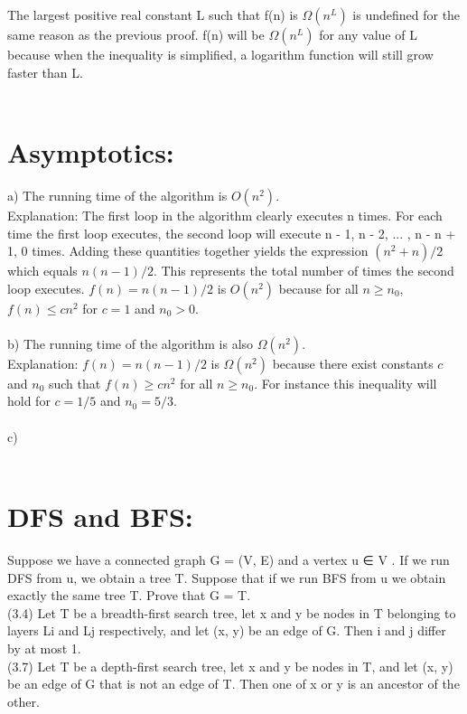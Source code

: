\documentclass{article}
\begin{document}
The largest positive real constant L such that f(n) is $\Omega(n^L)$ is undefined for the same reason as the previous proof. f(n) will be $\Omega(n^L)$ for any value of L because when the inequality is simplified, a logarithm function will still grow faster than L.\\\\

\section{Asymptotics:}
a) The running time of the algorithm is $O(n^2)$.\\
Explanation: The first loop in the algorithm clearly executes n times. For each time the first loop executes, the second loop will execute n - 1, n - 2, ... , n - n + 1, 0 times. Adding these quantities together yields the expression $(n^2 + n)/2$ which equals $n(n-1)/2$. This represents the total number of times the second loop executes. $f(n) = n(n-1)/2$ is $O(n^2)$ because for all $n \geq n_0$, $f(n) \leq cn^2$ for $c = 1$ and $n_0 > 0$.\\\\
b) The running time of the algorithm is also $\Omega(n^2)$.\\
Explanation: $f(n) = n(n-1)/2$ is $\Omega(n^2)$ because there exist constants $c$ and $n_0$ such that $f(n) \geq cn^2$ for all $n \geq n_0$. For instance this inequality will hold for $c = 1/5$ and $n_0 = 5/3$.\\\\
c)\\\\

\section{DFS and BFS:}
Suppose we have a connected graph G = (V, E)
and a vertex u ∈ V . If we run DFS from u, we obtain a tree T. Suppose that if we run BFS from u we
obtain exactly the same tree T. Prove that G = T.\\

(3.4) Let T be a breadth-first search tree, let x and y be nodes in T belonging
to layers Li and Lj respectively, and let (x, y) be an edge of G. Then i and j differ
by at most 1.\\
(3.7) Let T be a depth-first search tree, let x and y be nodes in T, and let
(x, y) be an edge of G that is not an edge of T. Then one of x or y is an ancestor
of the other.
\end{document}
